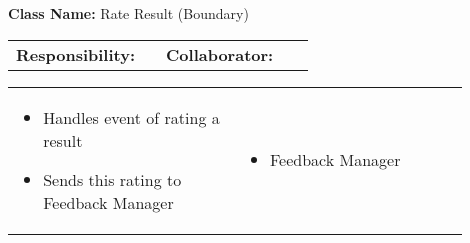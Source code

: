 \begin{red_cards}[]
    \textbf{Class Name:} Rate Result (Boundary)
    \tcbline
    \begin{tabular}{p{0.45\linewidth} | p{0.45\linewidth}}
        \textbf{Responsibility:}& 
        \textbf{Collaborator:}\\
    \end{tabular}
    \tcbline
    \begin{tabular}{p{0.45\linewidth} | p{0.45\linewidth}}
        \begin{itemize}
            \item Handles event of rating a result
            \item Sends this rating to Feedback Manager
        \end{itemize}
        &
        \begin{itemize}
            \item Feedback Manager
        \end{itemize}
    \end{tabular}
\end{red_cards}
